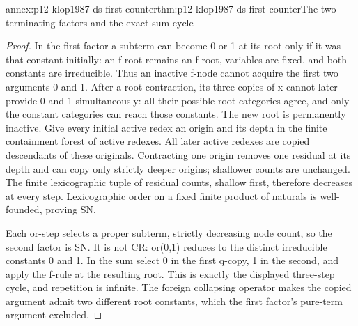 \begin{annexitem}{annex:p12-klop1987-ds-first-counter}{thm:p12-klop1987-ds-first-counter}{The two terminating factors and the exact sum cycle}
\begin{proof}
In the first factor a subterm can become 0 or 1 at its root only
if it was that constant initially: an f-root remains an f-root,
variables are fixed, and both constants are irreducible.
Thus an inactive f-node cannot acquire the first two arguments
0 and 1. After a root contraction, its three copies of x cannot
later provide 0 and 1 simultaneously: all their possible root
categories agree, and only the constant categories can reach those
constants. The new root is permanently inactive.
Give every initial active redex an origin and its depth in the
finite containment forest of active redexes. All later active
redexes are copied descendants of these originals. Contracting
one origin removes one residual at its depth and can copy only
strictly deeper origins; shallower counts are unchanged. The
finite lexicographic tuple of residual counts, shallow first,
therefore decreases at every step. Lexicographic order on a
fixed finite product of naturals is well-founded, proving SN.

Each or-step selects a proper subterm, strictly decreasing node
count, so the second factor is SN. It is not CR: or(0,1) reduces
to the distinct irreducible constants 0 and 1. In the sum select
0 in the first q-copy, 1 in the second, and apply the f-rule at
the resulting root. This is exactly the displayed three-step
cycle, and repetition is infinite. The foreign collapsing
operator makes the copied argument admit two different root
constants, which the first factor's pure-term argument excluded.
\end{proof}
\end{annexitem}

